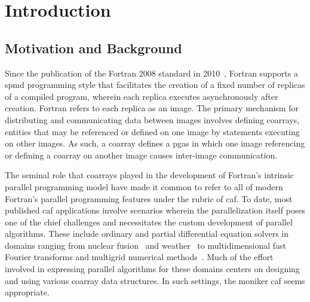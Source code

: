\section{Introduction}
\subsection{Motivation and Background}
Since the publication of the Fortran 2008 standard in 2010~\cite{iso2010information}, Fortran supports a \gls{spmd}
programming style that facilitates the creation of a fixed number of replicas of a compiled program, wherein each replica
executes asynchronously after creation.  Fortran refers to each replica as an image.  The primary mechanism for distributing and
communicating data between images involves defining \glspl{coarray}, entities that may be referenced or defined on one image by
statements executing on other images.  As such, a coarray defines a \gls{pgas} in which one image referencing or defining a
coarray on another image causes inter-image communication.

The seminal role that \glspl{coarray} played in the development of Fortran's intrinsic parallel programming model have made it
common to refer to all of modern Fortran's parallel programming features under the rubric of \gls{caf}.  To date, most
published \gls{caf} applications involve scenarios wherein the parallelization itself poses one of the chief
challenges and necessitates the custom development of parallel algorithms.  These include ordinary and partial differential
equation solvers in domains ranging from nuclear fusion~\cite{preissl2011multithreaded} and
weather~\cite{mozdzynski2015partitioned} to multidimensional fast Fourier transforms and multigrid numerical
methods~\cite{garain2015comparing}.  Much of the effort involved in
expressing parallel algorithms for these domains centers on
 designing and using various \gls{coarray} data structures.  In such settings, the moniker
\gls{caf} seems appropriate.


